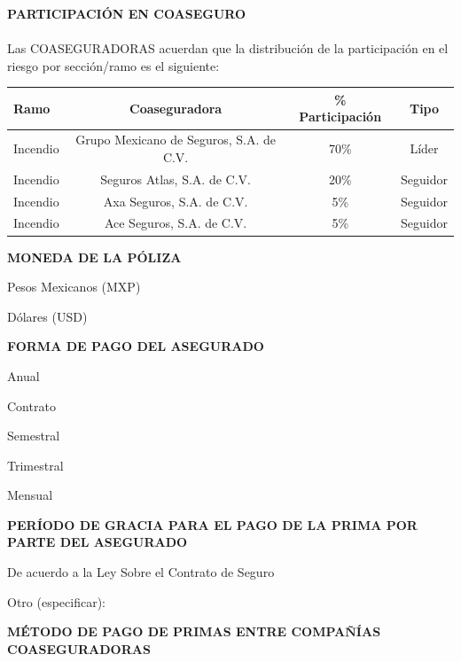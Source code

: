 \documentclass[letterpaper,10pt]{article}
\begin{document}
\textbf{PARTICIPACIÓN EN COASEGURO}\\\\
Las COASEGURADORAS acuerdan que la distribución de la participación en el riesgo por sección/ramo es el siguiente:

\begin{center}
    \begin{tabu} to \textwidth{|X[l]|c|c|c|}
        \hline
        \textbf{Ramo} & \textbf{Coaseguradora} & \textbf{\% Participación} & \textbf{Tipo}\\\hline
        Incendio & Grupo Mexicano de Seguros, S.A. de C.V. & 70\% & Líder\\\hline
        Incendio & Seguros Atlas, S.A. de C.V. & 20\% & Seguidor\\\hline
        Incendio & Axa Seguros, S.A. de C.V. & 5\% & Seguidor\\\hline
        Incendio & Ace Seguros, S.A. de C.V. & 5\% & Seguidor\\
        \hline
    \end{tabu}
\end{center}

\textbf{MONEDA DE LA PÓLIZA}

\begin{todolist}
    \item Pesos Mexicanos (MXP)
    \item Dólares (USD)
\end{todolist}

\textbf{FORMA DE PAGO DEL ASEGURADO}

\begin{todolist}
    \item Anual
    \item Contrato
    \item Semestral
    \item Trimestral
    \item Mensual
\end{todolist}

\textbf{PERÍODO DE GRACIA PARA EL PAGO DE LA PRIMA POR PARTE DEL ASEGURADO}

\begin{todolist}
    \item De acuerdo a la Ley Sobre el Contrato de Seguro
    \item Otro (especificar): \underline{\hspace{5cm}}
\end{todolist}
\newpage

\textbf{MÉTODO DE PAGO DE PRIMAS ENTRE COMPAÑÍAS COASEGURADORAS}
\end{document}
